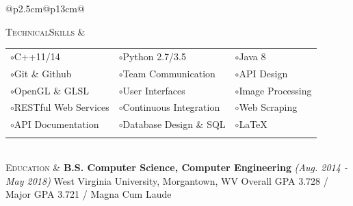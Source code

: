 \documentclass{article}
\begin{document}
\begin{tabular}{@{}p{2.5cm}@{\hspace{0.2cm}}p{13cm}@{}}

\vspace*{-3.7em}\textsc{Technical}\newline\textsc{Skills} &
\setlength{\tabcolsep}{12pt}
\begin{tabular}{@{}lll@{}}

$\circ$\enspace C++11/14 &
$\circ$\enspace Python 2.7/3.5 &
$\circ$\enspace Java 8 \\

$\circ$\enspace Git \& Github &
$\circ$\enspace Team Communication &
$\circ$\enspace API Design \\

$\circ$\enspace OpenGL \& GLSL &
$\circ$\enspace User Interfaces &
$\circ$\enspace Image Processing \\

$\circ$\enspace RESTful Web Services  &
$\circ$\enspace Continuous Integration &
$\circ$\enspace Web Scraping \\

$\circ$\enspace API Documentation &
$\circ$\enspace Database Design \& SQL &
$\circ$\enspace \LaTeX \\

\newline
\end{tabular} \\


\textsc{Education} &
\textbf{B.S. Computer Science, Computer Engineering}
\hfill\small\textit{(Aug. 2014 - May 2018)}\normalsize
\newline West Virginia University, Morgantown, WV \small
\newline Overall GPA 3.728 / Major GPA 3.721 / Magna Cum Laude
\newline
\normalsize \\



\end{tabular}
\end{document}
